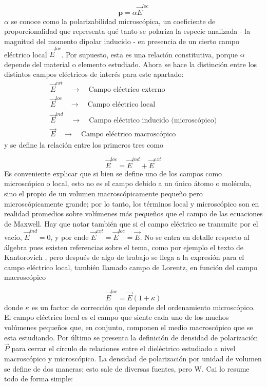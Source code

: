 \documentclass[12pt, twoside, onehalfspace, numbers, spanish]{ezthesis}
\numberwithin{equation}{section}
\begin{document}
\begin{equation}
\mathbf{p} = \alpha\vec{E}^{loc}
\end{equation}
\noindent
$\alpha$ se conoce como la polarizabilidad microscópica, un coeficiente de proporcionalidad que representa qué tanto se polariza la especie analizada - la magnitud del momento dipolar inducido - en presencia de un cierto campo eléctrico local $\vec{E}^{loc}$. Por supuesto, esta es una relación constitutiva, porque $\alpha$ depende del material o elemento estudiado. Ahora se hace la distinción entre los distintos campos eléctricos de interés para este apartado:
\begin{gather*}
\vec{E}^{ext} \quad \longrightarrow \quad \text{Campo eléctrico externo}\\
\vec{E}^{loc} \quad \longrightarrow \quad \text{Campo eléctrico local}\\
\vec{E}^{ind} \quad \longrightarrow \quad \text{Campo eléctrico inducido (microscópico)}\\
\vec{E} \quad \longrightarrow \quad \text{Campo eléctrico macroscópico}
\end{gather*}
\noindent
y se define la relación entre los primeros tres como

\begin{equation}
\vec{E}^{loc} = \vec{E}^{ind} + \vec{E}^{ext}
\end{equation}
\noindent
Es conveniente explicar que si bien se define uno de los campos como microscópico o local, esto no es el campo debido a un único átomo o molécula, sino el propio de un volumen macroscópicamente pequeño pero microscópicamente grande; por lo tanto, los términos local y microscópico son en realidad promedios sobre volúmenes más pequeños que el campo de las ecuaciones de Maxwell. Hay que notar también que si el campo eléctrico se transmite por el vacío, $\vec{E}^{ind} = 0$, y por ende $\vec{E}^{ext} = \vec{E}^{loc} = \vec{E}$. No se entra en detalle respecto al álgebra pues existen referencias sobre el tema, como por ejemplo el texto de Kantorovich \cite{Kantorovich}, pero después de algo de trabajo se llega a la expresión para el campo eléctrico local, también llamado campo de Lorentz, en función del campo macroscópico

\begin{equation}
\vec{E}^{loc} = \vec{E}(1 + \kappa)\label{eqn:Local_Field}
\end{equation}
\noindent
donde $\kappa$ es un factor de corrección que depende del ordenamiento microscópico. El campo eléctrico local es el campo que siente cada uno de los muchos volúmenes pequeños que, en conjunto, componen el medio macroscópico que se esta estudiando. Por último se presenta la definición de densidad de polarización $\vec{P}$ para cerrar el círculo de relaciones entre el dieléctrico estudiado a nivel macroscópico y microscópico. La densidad de polarización por unidad de volumen se define de dos maneras; esto sale de diversas fuentes, pero W. Cai \cite{Cai} lo resume todo de forma simple:
\end{document}
